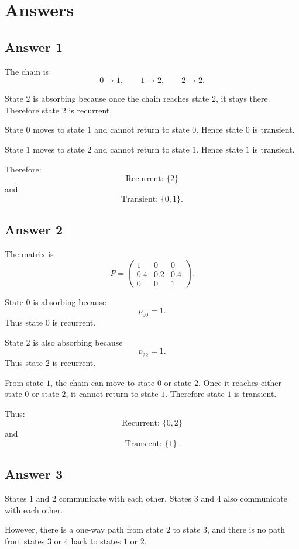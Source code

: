\documentclass[12pt,a4paper]{article}
\theoremstyle{notestyle}
\begin{document}
\section{Answers}

\subsection*{Answer 1}

The chain is
\[
0\to 1,\qquad 1\to 2,\qquad 2\to 2.
\]

State $2$ is absorbing because once the chain reaches state $2$, it stays there. Therefore state $2$ is recurrent.

State $0$ moves to state $1$ and cannot return to state $0$. Hence state $0$ is transient.

State $1$ moves to state $2$ and cannot return to state $1$. Hence state $1$ is transient.

Therefore:
\[
\boxed{\text{Recurrent: } \{2\}}
\]
and
\[
\boxed{\text{Transient: } \{0,1\}.}
\]

\subsection*{Answer 2}

The matrix is
\[
P=
\begin{pmatrix}
1 & 0 & 0\\
0.4 & 0.2 & 0.4\\
0 & 0 & 1
\end{pmatrix}.
\]

State $0$ is absorbing because
\[
p_{00}=1.
\]
Thus state $0$ is recurrent.

State $2$ is also absorbing because
\[
p_{22}=1.
\]
Thus state $2$ is recurrent.

From state $1$, the chain can move to state $0$ or state $2$. Once it reaches either state $0$ or state $2$, it cannot return to state $1$. Therefore state $1$ is transient.

Thus:
\[
\boxed{\text{Recurrent: } \{0,2\}}
\]
and
\[
\boxed{\text{Transient: } \{1\}.}
\]

\subsection*{Answer 3}

States $1$ and $2$ communicate with each other. States $3$ and $4$ also communicate with each other.

However, there is a one-way path from state $2$ to state $3$, and there is no path from states $3$ or $4$ back to states $1$ or $2$.
\end{document}
